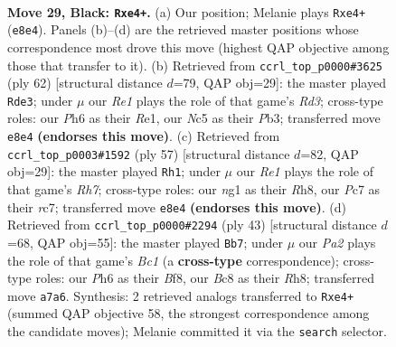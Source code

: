 \documentclass[11pt]{article}
\begin{document}
\clearpage

\begin{figure}[p]\centering
\begin{subfigure}{0.46\textwidth}\centering
\resizebox{\linewidth}{!}{%
\newchessgame
\chessboard[
  setfen={1rb1r1k1/p1p2pp1/3P3p/2n4P/p3P1n1/2P5/6R1/R1B1KBN1 b Q - 0 29},
  showmover=false,
  pgfstyle=straightmove, color=movearrow, markmove={e8-e4}
]}
\caption{}
\end{subfigure}\hfill
\begin{subfigure}{0.46\textwidth}\centering
\resizebox{\linewidth}{!}{%
\newchessgame
\chessboard[
  setfen={2r3k1/pp1b1n2/3bp1p1/3p3p/P6P/1PBR1N2/5PP1/4R1K1 w - - 0 32},
  showmover=false,
  pgfstyle=straightmove, color=movearrow, markmove={d3-e3}
]}
\caption{}
\end{subfigure}
\\[4pt]
\begin{subfigure}{0.46\textwidth}\centering
\resizebox{\linewidth}{!}{%
\newchessgame
\chessboard[
  setfen={7r/1pR2pk1/p4bp1/P2Pp3/5n2/4BP2/KP5r/3R1B2 b - - 1 29},
  showmover=false,
  pgfstyle=straightmove, color=movearrow, markmove={h2-h1}
]}
\caption{}
\end{subfigure}\hfill
\begin{subfigure}{0.46\textwidth}\centering
\resizebox{\linewidth}{!}{%
\newchessgame
\chessboard[
  setfen={2b1kb1r/3n1ppp/p3p2P/4p3/4NP1B/1r6/1P2B1P1/1K1R3R b k - 1 22},
  showmover=false,
  pgfstyle=straightmove, color=movearrow, markmove={c8-b7}
]}
\caption{}
\end{subfigure}
\caption{\textbf{Move 29, Black: \texttt{Rxe4+}.} (a) Our position; Melanie plays \texttt{Rxe4+} (\texttt{e8e4}). Panels (b)--(d) are the retrieved master positions whose correspondence most drove this move (highest QAP objective among those that transfer to it). (b) Retrieved from \texttt{ccrl\_top\_p0000\#3625} (ply 62) [structural distance $d$=79, QAP obj=29]: the master played \texttt{Rde3}; under $\mu$ our \emph{Re1} plays the role of that game's \emph{Rd3}; cross-type roles: our \emph{P}h6 as their \emph{R}e1, our \emph{N}c5 as their \emph{P}b3; transferred move \texttt{e8e4} \textbf{(endorses this move)}. (c) Retrieved from \texttt{ccrl\_top\_p0003\#1592} (ply 57) [structural distance $d$=82, QAP obj=29]: the master played \texttt{Rh1}; under $\mu$ our \emph{Re1} plays the role of that game's \emph{Rh7}; cross-type roles: our \emph{n}g1 as their \emph{R}h8, our \emph{P}c7 as their \emph{r}c7; transferred move \texttt{e8e4} \textbf{(endorses this move)}. (d) Retrieved from \texttt{ccrl\_top\_p0000\#2294} (ply 43) [structural distance $d$=68, QAP obj=55]: the master played \texttt{Bb7}; under $\mu$ our \emph{Pa2} plays the role of that game's \emph{Bc1} (a \textbf{cross-type} correspondence); cross-type roles: our \emph{P}h6 as their \emph{B}f8, our \emph{B}c8 as their \emph{R}h8; transferred move \texttt{a7a6}. Synthesis: 2 retrieved analogs transferred to \texttt{Rxe4+} (summed QAP objective 58, the strongest correspondence among the candidate moves); Melanie committed it via the \texttt{search} selector.}
\label{fig:thought-m57}
\end{figure}
\end{document}
